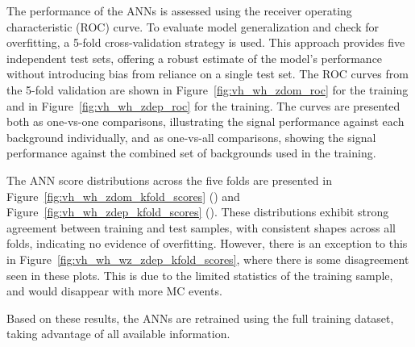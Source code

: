 The performance of the ANNs is assessed using the receiver operating characteristic (ROC) curve. To evaluate model generalization and check for overfitting, a 5-fold cross-validation strategy is used. This approach provides five independent test sets, offering a robust estimate of the model's performance without introducing bias from reliance on a single test set. The ROC curves from the 5-fold validation are shown in Figure~\ref{fig:vh_wh_zdom_roc} for the \zdom{} training and in Figure~\ref{fig:vh_wh_zdep_roc} for the \zdep{} training. The curves are presented both as one-vs-one comparisons, illustrating the signal performance against each background individually, and as one-vs-all comparisons, showing the signal performance against the combined set of backgrounds used in the training.

The ANN score distributions across the five folds are presented in Figure~\ref{fig:vh_wh_zdom_kfold_scores} (\zdom{}) and Figure~\ref{fig:vh_wh_zdep_kfold_scores} (\zdep{}). These distributions exhibit strong agreement between training and test samples, with consistent shapes across all folds, indicating no evidence of overfitting. However, there is an exception to this in Figure~\ref{fig:vh_wh_wz_zdep_kfold_scores}, where there is some disagreement seen in these plots. This is due to the limited statistics of the training sample, and would disappear with more MC events.

Based on these results, the ANNs are retrained using the full training dataset, taking advantage of all available information.
